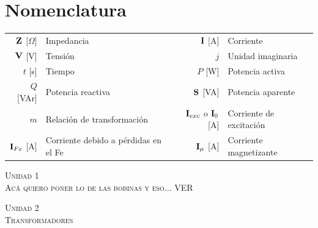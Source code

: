 \documentclass[11pt,a4paper]{article}
\newcommand{\fasor}[1]{\uppercase{\textbf{#1}}}
\newcommand{\unidad}[2]{\begin{center}
		\fontsize{10}{10}\selectfont\color{gray!50!black}\scshape Unidad #1 \\
		\fontsize{14}{14}\selectfont \scshape #2
\end{center} \vspace{-.6cm}}
\begin{document}
    \pagestyle{fancy}
    \section*{Nomenclatura}
    \begin{tabular}{r l r l}
		$\fasor{Z}$ [$\Omega$]& Impedancia &
		$\fasor{i}$ [A] & Corriente \\
		$\fasor{v}$ [V] & Tensión&
		$j$ & Unidad imaginaria \\
		$t$ [s] & Tiempo &
		$P$ [W] & Potencia activa \\
		$Q$ [VAr] & Potencia reactiva &
		$\fasor{s}$ [VA] & Potencia aparente \\
        $m$ & Relación de transformación&
        $\fasor{I}_{exc}$ o $\fasor{I}_0$ [A] & Corriente de excitación\\
        $\fasor{I}_{Fe}$ [A] & Corriente debido a pérdidas en el Fe&
        $\fasor{I}_{\mu}$ [A] & Corriente magnetizante\\
	\end{tabular}
    \unidad{1}{Acá quiero poner lo de las bobinas y eso... VER}
    \unidad{2}{Transformadores}
\end{document}
